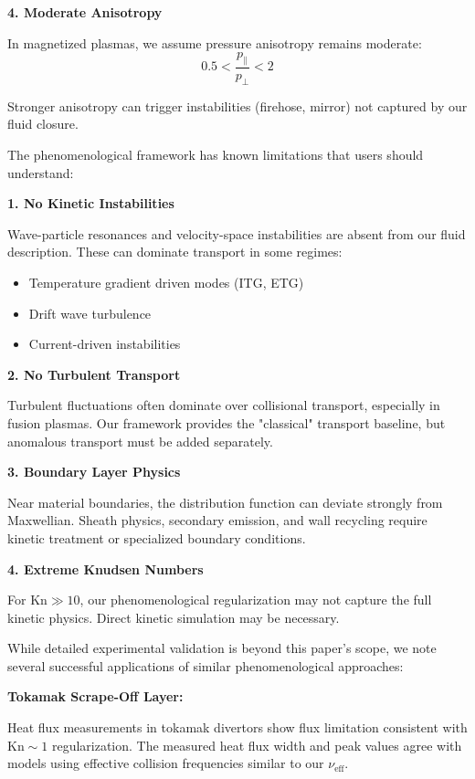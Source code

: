 \documentclass[12pt,a4paper]{article}
\newcommand{\Kn}{\text{Kn}}
\newcommand{\eff}{\text{eff}}
\begin{document}
\textbf{4. Moderate Anisotropy}

In magnetized plasmas, we assume pressure anisotropy remains moderate:
\begin{equation}
0.5 < \frac{p_{\parallel}}{p_{\perp}} < 2
\label{eq:moderate_anisotropy}
\end{equation}

Stronger anisotropy can trigger instabilities (firehose, mirror) not captured by our fluid closure.

The phenomenological framework has known limitations that users should understand:

\textbf{1. No Kinetic Instabilities}

Wave-particle resonances and velocity-space instabilities are absent from our fluid description. These can dominate transport in some regimes:
\begin{itemize}[leftmargin=*]
\item Temperature gradient driven modes (ITG, ETG)
\item Drift wave turbulence
\item Current-driven instabilities
\end{itemize}

\textbf{2. No Turbulent Transport}

Turbulent fluctuations often dominate over collisional transport, especially in fusion plasmas. Our framework provides the "classical" transport baseline, but anomalous transport must be added separately.

\textbf{3. Boundary Layer Physics}

Near material boundaries, the distribution function can deviate strongly from Maxwellian. Sheath physics, secondary emission, and wall recycling require kinetic treatment or specialized boundary conditions.

\textbf{4. Extreme Knudsen Numbers}

For $\Kn \gg 10$, our phenomenological regularization may not capture the full kinetic physics. Direct kinetic simulation may be necessary.

While detailed experimental validation is beyond this paper's scope, we note several successful applications of similar phenomenological approaches:

\textbf{Tokamak Scrape-Off Layer:}

Heat flux measurements in tokamak divertors show flux limitation consistent with $\Kn \sim 1$ regularization. The measured heat flux width and peak values agree with models using effective collision frequencies similar to our $\nu_{\eff}$.
\end{document}
